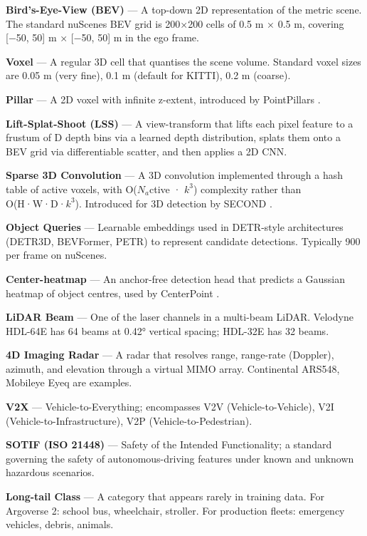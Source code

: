 \documentclass{article}
\begin{document}
\textbf{Bird's-Eye-View (BEV)} --- A top-down 2D representation of the metric scene. The standard nuScenes BEV grid is 200×200 cells of 0.5 m × 0.5 m, covering {[}−50, 50{]} m × {[}−50, 50{]} m in the ego frame.

\textbf{Voxel} --- A regular 3D cell that quantises the scene volume. Standard voxel sizes are 0.05 m (very fine), 0.1 m (default for KITTI), 0.2 m (coarse).

\textbf{Pillar} --- A 2D voxel with infinite z-extent, introduced by PointPillars \citep{lang2019pointpillarsfasten}.

\textbf{Lift-Splat-Shoot (LSS)} --- A view-transform that lifts each pixel feature to a frustum of D depth bins via a learned depth distribution, splats them onto a BEV grid via differentiable scatter, and then applies a 2D CNN.

\textbf{Sparse 3D Convolution} --- A 3D convolution implemented through a hash table of active voxels, with O(\(N_a\)ctive · \(k^3\)) complexity rather than O(H·W·D·\(k^3\)). Introduced for 3D detection by SECOND \citep{yan2018secondsparselyembe}.

\textbf{Object Queries} --- Learnable embeddings used in DETR-style architectures (DETR3D, BEVFormer, PETR) to represent candidate detections. Typically 900 per frame on nuScenes.

\textbf{Center-heatmap} --- An anchor-free detection head that predicts a Gaussian heatmap of object centres, used by CenterPoint \citep{yin2021multimodalvirtualp}.

\textbf{LiDAR Beam} --- One of the laser channels in a multi-beam LiDAR. Velodyne HDL-64E has 64 beams at 0.42° vertical spacing; HDL-32E has 32 beams.

\textbf{4D Imaging Radar} --- A radar that resolves range, range-rate (Doppler), azimuth, and elevation through a virtual MIMO array. Continental ARS548, Mobileye Eyeq are examples.

\textbf{V2X} --- Vehicle-to-Everything; encompasses V2V (Vehicle-to-Vehicle), V2I (Vehicle-to-Infrastructure), V2P (Vehicle-to-Pedestrian).

\textbf{SOTIF (ISO 21448)} --- Safety of the Intended Functionality; a standard governing the safety of autonomous-driving features under known and unknown hazardous scenarios.

\textbf{Long-tail Class} --- A category that appears rarely in training data. For Argoverse 2: school bus, wheelchair, stroller. For production fleets: emergency vehicles, debris, animals.
\end{document}
